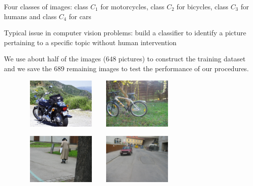 \begin{slide}
\vs\pause Four classes of images: 
class $C_1$ for motorcycles, class $C_2$ for bicycles, class $C_3$ for humans
and class $C_4$ for cars

\end{slide}\begin{slide}

Typical issue in computer vision problems: build a classifier to identify a
picture pertaining to a specific topic without human intervention

\vs\pause We use about half of the images ($648$ pictures) to construct the training dataset and we save the
$689$ remaining images to test the performance of our procedures. 

\end{slide}\begin{slide}

\begin{figure}
\centerline{\includegraphics[width=4cm,height=2.5cm]{figures/moto.eps}\quad
\includegraphics[width=4cm,height=2.5cm]{figures/bike.eps}}
\medskip
\centerline{\includegraphics[width=4cm,height=2.5cm]{figures/people.eps}\quad
\includegraphics[width=4cm,height=2.5cm]{figures/car.eps}}
\end{figure}

\end{slide}\begin{slide}


\end{slide}
